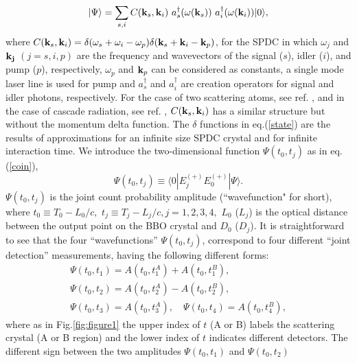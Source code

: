 \begin{equation}
| \Psi \rangle =\sum_{s,i} C({\bf k}_{s}, {\bf k}_{i}) \ a_{s}^{\dagger }(\omega ({\bf
k}_{s}))\ a_{i}^{\dagger }(\omega ({\bf k}_{i}))| 0\rangle \label{state} ,
\end{equation}
where $C({\bf k}_{s}, {\bf k}_{i})=\delta( \omega_{s}+\omega_{i}-\omega_{p}) \delta( {\bf
k}_{s}+{\bf k}_{i}-{\bf k}_{p})$, for the SPDC in which $\omega_{j}$ and ${\bf k_{j}}$
$(j = s, i, p)$ are the frequency and wavevectors of the signal ($s$), idler ($i$), and
pump ($p$), respectively, $\omega_{p}$ and ${\bf k}_{p}$ can be considered as constants,
a single mode laser line is used for pump and $a_{s}^{\dagger }$ and $a_{i}^{\dagger }$
are creation operators for signal and idler photons, respectively. For the case of two
scattering atoms, see ref. \cite{Scully}, and in the case of cascade radiation, see ref.
\cite{Scully2}, $C({\bf k}_{s}, {\bf k}_{i})$ has a similar structure but without the
momentum delta function. The $\delta$ functions in eq.(\ref{state}) are the results of
approximations for an infinite size SPDC crystal and for infinite interaction time. We
introduce the two-dimensional function $\Psi (t_{0}, t_{j})$ as in eq.(\ref{coin}),
\begin{equation}
\Psi(t_{0}, t_{j})\equiv \langle 0| E_{j}^{(+)}E_{0}^{(+)}| \Psi \rangle .
\label{wavefunction}
\end{equation}
$\Psi(t_0,t_j)$ is the joint count probability amplitude (``wavefunction" for short),
where $t_{0}\equiv T_{0}-L_{0}/c,$ $%
t_{j}\equiv T_{j}-L_{j}/c, j=1,2,3,4,$ $L_{0}$ ($L_{j}$) is the optical distance between
the output point on the BBO crystal and $D_{0}$ ($D_{j}$). It is straightforward to see
that the four ``wavefunctions'' $\Psi (t_{0}, t_{j})$, correspond to four different
``joint detection'' measurements, having the following different forms:
\begin{eqnarray}
&\Psi(t_{0}, t_{1}) = A(t_{0},t_{1}^{A})+A(t_{0},t_{1}^{B}),& \nonumber \\ &\Psi (t_{0},
t_{2}) =A(t_{0},t_{2}^{A})-A(t_{0},t_{2}^{B}) ,& \label{R12}  \\
&\Psi(t_{0},t_{3})=A(t_{0},t_{3}^{A}),\quad \Psi (t_{0},t_{4})=A(t_{0},t_{4}^{B}) ,&
\label{R34}
\end{eqnarray}
where as in Fig.\ref{fig:figure1} the upper index of $t$ (A or B) labels the scattering
crystal (A or B region) and the lower index of $t$ indicates different detectors. The
different sign between the two amplitudes $\Psi (t_{0}, t_{1})$ and $\Psi (t_{0}, t_{2})$
